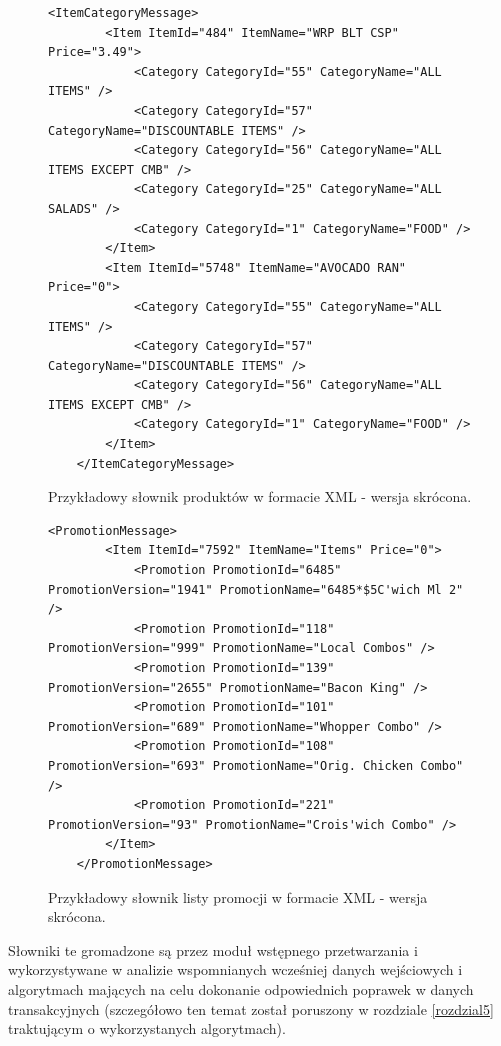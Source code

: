\documentclass[a4paper]{book}
\begin{document}
\begin{figure}[t]
	\begin{lstlisting}[frame=single, breaklines=true]
	<ItemCategoryMessage>
		<Item ItemId="484" ItemName="WRP BLT CSP" Price="3.49">
			<Category CategoryId="55" CategoryName="ALL ITEMS" />
			<Category CategoryId="57" CategoryName="DISCOUNTABLE ITEMS" />
			<Category CategoryId="56" CategoryName="ALL ITEMS EXCEPT CMB" />
			<Category CategoryId="25" CategoryName="ALL SALADS" />
			<Category CategoryId="1" CategoryName="FOOD" />
		</Item>
		<Item ItemId="5748" ItemName="AVOCADO RAN" Price="0">
			<Category CategoryId="55" CategoryName="ALL ITEMS" />
			<Category CategoryId="57" CategoryName="DISCOUNTABLE ITEMS" />
			<Category CategoryId="56" CategoryName="ALL ITEMS EXCEPT CMB" />
			<Category CategoryId="1" CategoryName="FOOD" />
		</Item>
	</ItemCategoryMessage>
	\end{lstlisting}
	\caption{Przykładowy słownik produktów w formacie XML - wersja skrócona.}
	\label{lst:przykladowySlownikProduktow}
\end{figure}

\begin{figure}[t]
	\begin{lstlisting}[frame=single, breaklines=true]
	<PromotionMessage>
		<Item ItemId="7592" ItemName="Items" Price="0">
			<Promotion PromotionId="6485" PromotionVersion="1941" PromotionName="6485*$5C'wich Ml 2" />
			<Promotion PromotionId="118" PromotionVersion="999" PromotionName="Local Combos" />
			<Promotion PromotionId="139" PromotionVersion="2655" PromotionName="Bacon King" />
			<Promotion PromotionId="101" PromotionVersion="689" PromotionName="Whopper Combo" />
			<Promotion PromotionId="108" PromotionVersion="693" PromotionName="Orig. Chicken Combo" />
			<Promotion PromotionId="221" PromotionVersion="93" PromotionName="Crois'wich Combo" />
		</Item>
	</PromotionMessage>
	\end{lstlisting}
	\caption{Przykładowy słownik listy promocji w formacie XML - wersja skrócona.}
	\label{lst:przykladowySlownikPromocji}
\end{figure}
Słowniki te gromadzone są przez moduł wstępnego przetwarzania i wykorzystywane w analizie wspomnianych wcześniej danych wejściowych i algorytmach mających na celu dokonanie odpowiednich poprawek w danych transakcyjnych (szczegółowo ten temat został poruszony w rozdziale \ref{rozdzial5} traktującym o wykorzystanych algorytmach).
\end{document}
